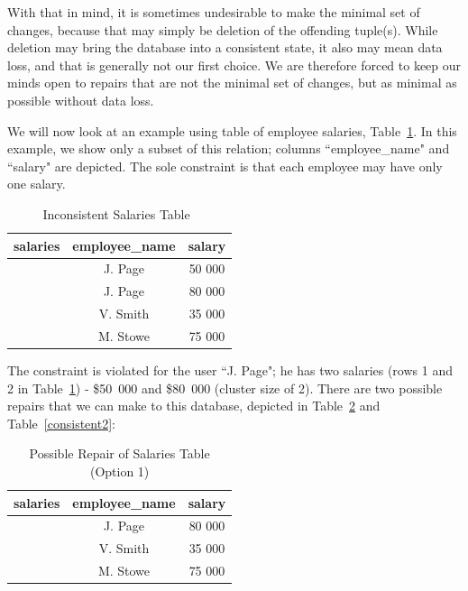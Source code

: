 With that in mind, it is sometimes undesirable to make the minimal set of changes, because that may simply be deletion of the offending tuple(s). While deletion may bring the database into a consistent state, it also may mean data loss, and that is generally not our first choice. We are therefore forced to keep our minds open to repairs that are not the minimal set of changes, but as minimal as possible without data loss.

We will now look at an example using table of employee salaries, Table~\ref{inconsistent1}. In this example, we show only a subset of this relation; columns ``employee\_name" and ``salary" are depicted. The sole constraint is that each employee may have only one salary.

\begin{table}[h]\begin{center}
        \begin{tabular}{r | c  c} 
					salaries & employee\_name & salary \\ \hline
	           		 & J. Page  & 50 000 \\ 
	         		 & J. Page  & 80 000 \\ 
					 & V. Smith & 35 000 \\ 
					 & M. Stowe & 75 000 \\ 
        \end{tabular}
        \caption[Inconsistent Salaries Table]{Inconsistent Salaries Table~\cite{CQ}\label{inconsistent1}}
\end{center}\end{table}

The constraint is violated for the user ``J. Page"; he has two salaries (rows 1 and 2 in Table~\ref{inconsistent1}) - \$50~000 and \$80~000 (cluster size of 2). There are two possible repairs that we can make to this database, depicted in Table~\ref{consistent1} and Table~\ref{consistent2}:

\begin{table}[h]\begin{center}
        \begin{tabular}{r | c  c} 
					salaries & employee\_name & salary \\ \hline
	         		 & J. Page  & 80 000 \\ 
					 & V. Smith & 35 000 \\ 
					 & M. Stowe & 75 000 \\ 
        \end{tabular}
        \caption[Possible Repair of Salaries Table (Option 1)]{Possible Repair of Salaries Table (Option 1) \cite{CQ}\label{consistent1}}
\end{center}\end{table}

